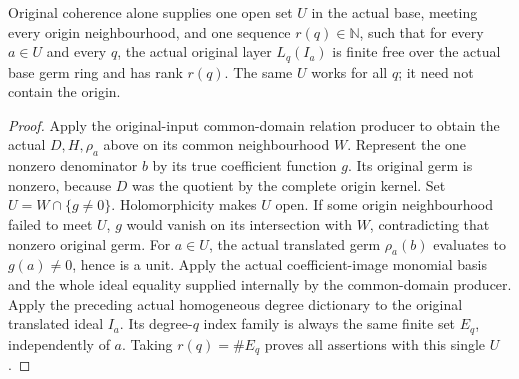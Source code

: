 \begin{theorem}
\label{hir:relative-normal-nearby-all-degree-uniform-rank}
\leanok
{}
Original coherence alone supplies one open set $U$ in the actual base,
meeting every origin neighbourhood, and one sequence $r(q)\in\mathbb N$,
such that for every $a\in U$ and every $q$, the actual original layer
$L_q(I_a)$ is finite free over the actual base germ ring and has rank
$r(q)$. The same $U$ works for all $q$; it need not contain the origin.
\end{theorem}
\begin{proof}
Apply the original-input common-domain relation producer to obtain the
actual $D,H,\rho_a$ above on its common neighbourhood $W$. Represent the
one nonzero denominator $b$ by its true coefficient function $g$.
Its original germ is nonzero, because $D$ was the quotient by the complete
origin kernel. Set $U=W\cap\{g\ne0\}$. Holomorphicity makes $U$ open.
If some origin neighbourhood failed to meet $U$, $g$ would vanish on
its intersection with $W$, contradicting that nonzero original germ.
For $a\in U$, the actual translated germ $\rho_a(b)$ evaluates to
$g(a)\ne0$, hence is a unit. Apply the actual coefficient-image monomial
basis and the whole ideal equality supplied internally by the common-domain
producer. Apply the preceding actual homogeneous degree dictionary to the
original translated ideal $I_a$. Its degree-$q$ index family is always
the same finite set $E_q$, independently of $a$. Taking $r(q)=\#E_q$
proves all assertions with this single $U$.
\end{proof}

